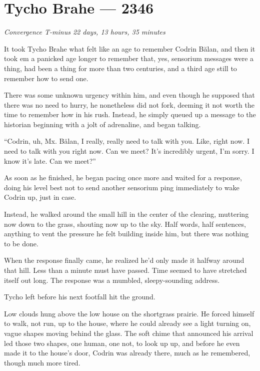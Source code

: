 \hypertarget{tycho-brahe-2346}{%
\chapter{Tycho Brahe — 2346}\label{tycho-brahe-2346}}

\begin{center}
\emph{Convergence T-minus 22 days, 13 hours, 35 minutes}
\end{center}

\noindent It took Tycho Brahe what felt like an age to remember Codrin Bălan, and then it took em a panicked age longer to remember that, yes, sensorium messages were a thing, had been a thing for more than two centuries, and a third age still to remember how to send one.

There was some unknown urgency within him, and even though he supposed that there was no need to hurry, he nonetheless did not fork, deeming it not worth the time to remember how in his rush. Instead, he simply queued up a message to the historian beginning with a jolt of adrenaline, and began talking.

``Codrin, uh, Mx. Bălan, I really, really need to talk with you. Like, right now. I need to talk with you right now. Can we meet? It's incredibly urgent, I'm sorry. I know it's late. Can we meet?''

As soon as he finished, he began pacing once more and waited for a response, doing his level best not to send another sensorium ping immediately to wake Codrin up, just in case.

Instead, he walked around the small hill in the center of the clearing, muttering now down to the grass, shouting now up to the sky. Half words, half sentences, anything to vent the pressure he felt building inside him, but there was nothing to be done.

When the response finally came, he realized he'd only made it halfway around that hill. Less than a minute must have passed. Time seemed to have stretched itself out long. The response was a mumbled, sleepy-sounding address.

Tycho left before his next footfall hit the ground.

Low clouds hung above the low house on the shortgrass prairie. He forced himself to walk, not run, up to the house, where he could already see a light turning on, vague shapes moving behind the glass. The soft chime that announced his arrival led those two shapes, one human, one not, to look up up, and before he even made it to the house's door, Codrin was already there, much as he remembered, though much more tired.


